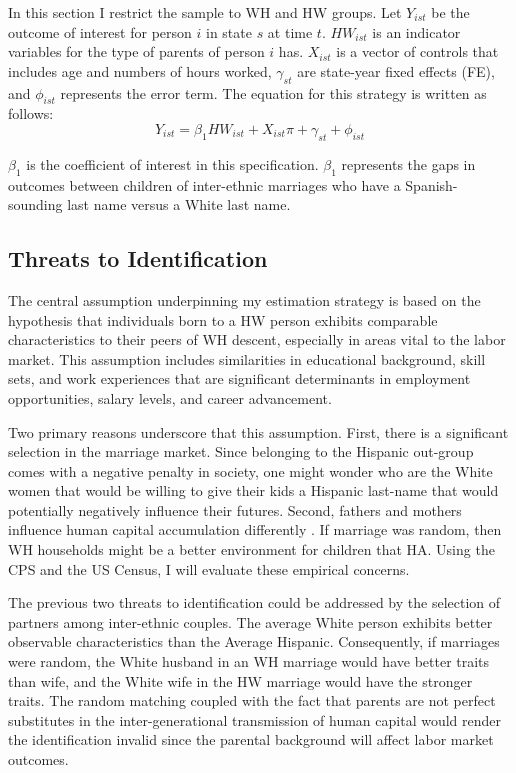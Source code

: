 In this section I restrict the sample to WH and HW groups. Let $Y_{ist}$ be the outcome of interest for person $i$ in state $s$ at time $t$. $HW_{ist}$ is an indicator variables for the type of parents of person $i$ has. $X_{ist}$ is a vector of controls that includes age and numbers of hours worked, $\gamma_{st}$ are state-year fixed effects (FE), and $\phi_{ist}$ represents the error term. The equation for this strategy is written as follows:
\begin{equation} \label{eq:1a}
Y_{ist} = \beta_{1} HW_{ist} + X_{ist} \pi + \gamma_{st} + \phi_{ist}
\end{equation}

$\beta_{1}$ is the coefficient of interest in this specification. $\beta_{1}$ represents the gaps in outcomes between children of inter-ethnic marriages who have a Spanish-sounding last name versus a White last name. 

\subsection{Threats to Identification}

The central assumption underpinning my estimation strategy is based on the hypothesis that individuals born to a HW person exhibits comparable characteristics to their peers of WH descent, especially in areas vital to the labor market. This assumption includes similarities in educational background, skill sets, and work experiences that are significant determinants in employment opportunities, salary levels, and career advancement. 

Two primary reasons underscore that this assumption. First, there is a significant selection in the marriage market. Since belonging to the Hispanic out-group comes with a negative penalty in society, one might wonder who are the White women that would be willing to give their kids a Hispanic last-name that would potentially negatively influence their futures. Second, fathers and mothers influence human capital accumulation differently \autocite{kimball2009risk,magruder2010intergenerational}. If marriage was random, then WH households might be a better environment for children that HA. Using the CPS and the US Census, I will evaluate these empirical concerns. 

The previous two threats to identification could be addressed by the selection of partners among inter-ethnic couples. The average White person exhibits better observable characteristics than the Average Hispanic. Consequently, if marriages were random, the White husband in an WH marriage would have better traits than wife, and the White wife in the HW marriage would have the stronger traits. The random matching coupled with the fact that parents are not perfect substitutes in the inter-generational transmission of human capital would render the identification invalid since the parental background will affect labor market outcomes. 

